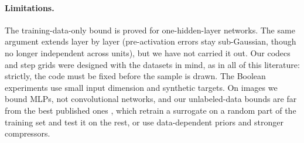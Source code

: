 \paragraph{Limitations.} The training-data-only bound is proved for one-hidden-layer networks. The same argument extends layer by layer (pre-activation errors stay sub-Gaussian, though no longer independent across units), but we have not carried it out. Our codecs and step grids were designed with the datasets in mind, as in all of this literature: strictly, the code must be fixed before the sample is drawn. The Boolean experiments use small input dimension and synthetic targets. On images we bound MLPs, not convolutional networks, and our unlabeled-data bounds are far from the best published ones \cite{bazinet2026bound}, which retrain a surrogate on a random part of the training set and test it on the rest, or use data-dependent priors and stronger compressors.
